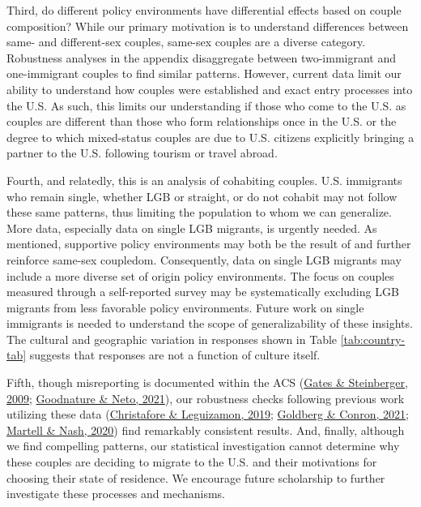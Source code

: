 \documentclass[
  11pt,
]{article}
\begin{document}
Third, do different policy environments have differential effects based on couple composition? While our primary motivation is to understand differences between same- and different-sex couples, same-sex couples are a diverse category. Robustness analyses in the appendix disaggregate between two-immigrant and one-immigrant couples to find similar patterns. However, current data limit our ability to understand how couples were established and exact entry processes into the U.S. As such, this limits our understanding if those who come to the U.S. as couples are different than those who form relationships once in the U.S. or the degree to which mixed-status couples are due to U.S. citizens explicitly bringing a partner to the U.S. following tourism or travel abroad.

Fourth, and relatedly, this is an analysis of cohabiting couples. U.S. immigrants who remain single, whether LGB or straight, or do not cohabit may not follow these same patterns, thus limiting the population to whom we can generalize. More data, especially data on single LGB migrants, is urgently needed. As mentioned, supportive policy environments may both be the result of and further reinforce same-sex coupledom. Consequently, data on single LGB migrants may include a more diverse set of origin policy environments. The focus on couples measured through a self-reported survey may be systematically excluding LGB migrants from less favorable policy environments. Future work on single immigrants is needed to understand the scope of generalizability of these insights. The cultural and geographic variation in responses shown in Table \ref{tab:country-tab} suggests that responses are not a function of culture itself.

Fifth, though misreporting is documented within the ACS (\protect\hyperlink{ref-gates_2009}{Gates \& Steinberger, 2009}; \protect\hyperlink{ref-goodnature_2021}{Goodnature \& Neto, 2021}), our robustness checks following previous work utilizing these data (\protect\hyperlink{ref-christafore_2019}{Christafore \& Leguizamon, 2019}; \protect\hyperlink{ref-goldberg_2021}{Goldberg \& Conron, 2021}; \protect\hyperlink{ref-martell_2020}{Martell \& Nash, 2020}) find remarkably consistent results. And, finally, although we find compelling patterns, our statistical investigation cannot determine why these couples are deciding to migrate to the U.S. and their motivations for choosing their state of residence. We encourage future scholarship to further investigate these processes and mechanisms.
\end{document}
